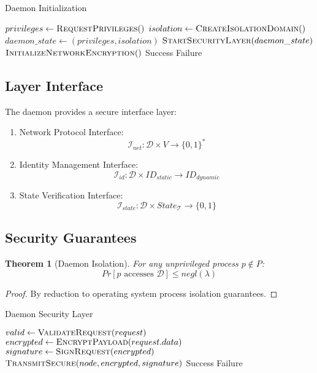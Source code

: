 \documentclass[12pt]{article}
\newtheorem{theorem}{Theorem}
\theoremstyle{definition}
\theoremstyle{remark}
\begin{document}
\begin{algorithm}
\caption{Daemon Initialization}
\begin{algorithmic}[1]
    \State $privileges \gets \textsc{RequestPrivileges}()$
    \State $isolation \gets \textsc{CreateIsolationDomain}()$
    \State $daemon\_state \gets (privileges, isolation)$
        \State $\textsc{StartSecurityLayer}(daemon\_state)$
        \State $\textsc{InitializeNetworkEncryption}()$
        \State \Return Success
    \EndIf
    \State \Return Failure
\EndProcedure
\end{algorithmic}
\end{algorithm}

\subsection{Layer Interface}
The daemon provides a secure interface layer:

\begin{enumerate}
    \item Network Protocol Interface:
    \[\mathcal{I}_{net}: \mathcal{D} \times V \rightarrow \{0,1\}^*\]
    
    \item Identity Management Interface:
    \[\mathcal{I}_{id}: \mathcal{D} \times ID_{static} \rightarrow ID_{dynamic}\]
    
    \item State Verification Interface:
    \[\mathcal{I}_{state}: \mathcal{D} \times State_{\mathcal{T}} \rightarrow \{0,1\}\]
\end{enumerate}

\subsection{Security Guarantees}

\begin{theorem}[Daemon Isolation]
For any unprivileged process $p \notin P$:
\[Pr[p \text{ accesses } \mathcal{D}] \leq negl(\lambda)\]
\end{theorem}

\begin{proof}
By reduction to operating system process isolation guarantees.
\end{proof}

\begin{algorithm}
\caption{Daemon Security Layer}
\begin{algorithmic}[1]
    \State $valid \gets \textsc{ValidateRequest}(request)$
        \State $encrypted \gets \textsc{EncryptPayload}(request.data)$
        \State $signature \gets \textsc{SignRequest}(encrypted)$
        \State $\textsc{TransmitSecure}(node, encrypted, signature)$
        \State \Return Success
    \EndIf
    \State \Return Failure
\EndProcedure
\end{algorithmic}
\end{algorithm}
\end{document}
